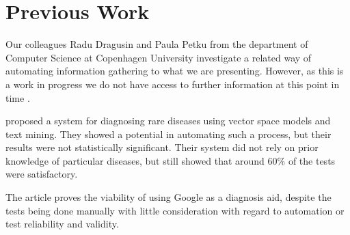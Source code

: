 \documentclass[10pt,letterpaper,final]{article}
\begin{document}

\section{Previous Work}
\label{chap:previouswork}
Our colleagues Radu Dragusin and Paula Petku from the department of
Computer Science at Copenhagen University investigate a related way of
automating information gathering to what we are presenting. However, as
this is a work in progress we do not have access to further information
at this point in time \cite{radupaula}.

\cite{jensenandersen} proposed a system for diagnosing rare diseases
using vector space models and text mining. They showed a potential in
automating such a process, but their results were not statistically
significant. Their system did not rely on prior knowledge of particular
diseases, but still showed that around 60\% of the tests were
satisfactory.


The article \cite{googlingdiagnosis} proves the viability of using
Google as a diagnosis aid, despite the tests being done manually with
little consideration with regard to automation or test reliability and
validity.



\end{document}
